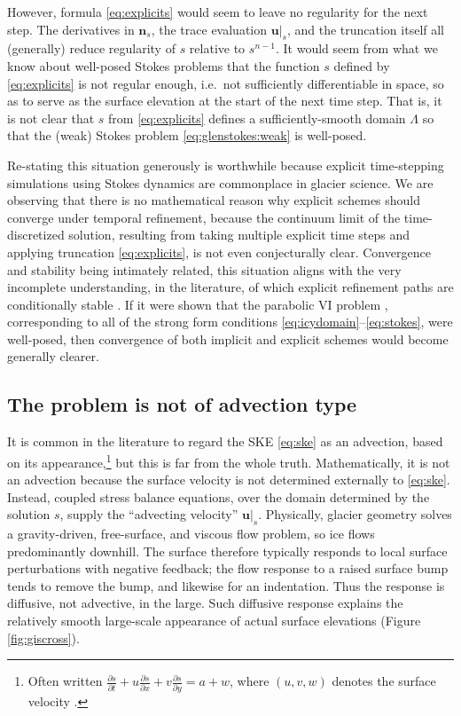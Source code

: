 \documentclass[hidelinks,onefignum,onetabnum,final]{siamart220329}  %
\newcommand{\bn}{\mathbf{n}}
\newcommand{\bu}{\mathbf{u}}
\begin{document}
However, formula \eqref{eq:explicits} would seem to leave no regularity for the next step.  The derivatives in $\bn_{s}$, the trace evaluation $\bu|_{s}$, and the truncation itself all (generally) reduce regularity of $s$ relative to $s^{n-1}$.  It would seem from what we know about well-posed Stokes problems that the function $s$ defined by \eqref{eq:explicits} is not regular enough, i.e.~not sufficiently differentiable in space, so as to serve as the surface elevation at the start of the next time step.  That is, it is not clear that $s$ from \eqref{eq:explicits} defines a sufficiently-smooth domain $\Lambda$ so that the (weak) Stokes problem \eqref{eq:glenstokes:weak} is well-posed.

Re-stating this situation generously is worthwhile because explicit time-stepping simulations using Stokes dynamics are commonplace in glacier science.  We are observing that there is no mathematical reason why explicit schemes should converge under temporal refinement, because the continuum limit of the time-discretized solution, resulting from taking multiple explicit time steps and applying truncation \eqref{eq:explicits}, is not even conjecturally clear.  Convergence and stability being intimately related, this situation aligns with the very incomplete understanding, in the literature, of which explicit refinement paths are conditionally stable \cite[and references therein]{Bueler2023,Chengetal2017,LofgrenAhlkronaHelanow2022}.  If it were shown that the parabolic  VI problem \cite{Glowinski1984}, corresponding to all of the strong form conditions \eqref{eq:icydomain}--\eqref{eq:stokes}, were well-posed, then convergence of both implicit and explicit schemes would become generally clearer.

\subsection{The problem is not of advection type} \label{subsec:notadv}  It is common in the literature to regard the SKE \eqref{eq:ske} as an advection, based on its appearance,\footnote{Often written $\frac{\partial s}{\partial t} + u \frac{\partial s}{\partial x} + v \frac{\partial s}{\partial y} = a + w$, where $(u,v,w)$ denotes the surface velocity \cite{GreveBlatter2009,SchoofHewitt2013}.} but this is far from the whole truth.  Mathematically, it is not an advection because the surface velocity is not determined externally to \eqref{eq:ske}.  Instead, coupled stress balance equations, over the domain determined by the solution $s$, supply the ``advecting velocity'' $\bu|_s$.  Physically, glacier geometry solves a gravity-driven, free-surface, and viscous flow problem, so ice flows predominantly downhill.  The surface therefore typically responds to local surface perturbations with negative feedback; the flow response to a raised surface bump tends to remove the bump, and likewise for an indentation.  Thus the response is diffusive, not advective, in the large.  Such diffusive response explains the relatively smooth large-scale appearance of actual surface elevations (Figure \ref{fig:giscross}).
\end{document}
